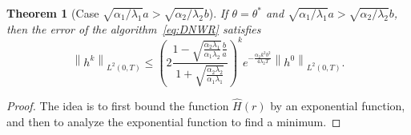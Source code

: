 \documentclass[reqno]{amsart}
\newtheorem{theorem}{Theorem}
\newcommand{\norm}[1]{\left\lVert#1\right\rVert}
\begin{document}
\begin{theorem}[Case $\sqrt{\alpha_1/\lambda_1} a > \sqrt{\alpha_2/\lambda_2} b$]\label{thm:cont-case1}
If $\theta = \theta^*$ and $\sqrt{\alpha_1/\lambda_1} a > \sqrt{\alpha_2/\lambda_2} b$, then the error of the algorithm~\eqref{eq:DNWR} satisfies 
\begin{equation}\label{eq:ContEst1}
\norm{h^k}_{L^2(0, T)} \leq \left(2\frac{1 - \sqrt{\frac{\alpha_2 \lambda_1}{\alpha_1\lambda_2}}\frac{b}{a}}{1 + \sqrt{\frac{\alpha_2 \lambda_2}{\alpha_1\lambda_1}}} \right)^k e^{-\frac{\alpha_2 k^2b^2}{4\lambda_2 T}} \norm{h^0}_{L^2(0, T)}.
\end{equation}
\end{theorem}


\begin{proof}
The idea is to first bound the function $\hat H(r)$ by an exponential function, and then to analyze the exponential function to find a minimum.


\end{proof}
\end{document}
